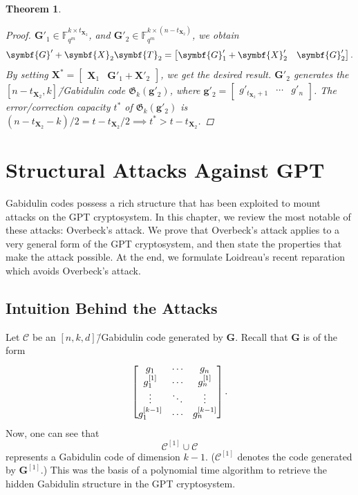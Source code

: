 \documentclass[version=last, paper=A4, parskip=half, oneside,%
toc=bibliography, toc=listof, listof=leveldown]{scrbook}
\theoremstyle{plain}
\newtheorem{theorem}{Theorem}
\theoremstyle{definition}
\theoremstyle{remark}
\renewcommand*{\vec}{\symbf}
\newcommand*{\mat}{\symbf}
\newcommand*{\FF}{\ensuremath{\mathbb{F}}}
\newcommand*{\Gab}{\ensuremath{\mathfrak{G}}}
\begin{document}
\begin{theorem}
\begin{proof}
    \(\mat{G}'_1 \in \FF_{q^m}^{k \times t_{\mat{X}_2}}\), and
    \(\mat{G}'_2 \in \FF_{q^m}^{k \times (n - t_{\mat{X}_2})}\), we obtain
    \[
      \mat{G}' + \mat{X}_2 \mat{T}_2 = \begin{bmatrix} \mat{G}'_1 + \mat{X}'_2 & \mat{G}'_2 \end{bmatrix}\text.
    \]
    By setting
    \(\mat{X}^* = \begin{bmatrix} \mat{X}_1 & \mat{G}'_1 + \mat{X}'_2 \end{bmatrix}\),
    we get the desired result.  \(\mat{G}'_2\) generates the
    \([n - t_{\mat{X}_2}, k]\)\=/Gabidulin code \(\Gab_k(\vec{g}'_2)\), where
    \(\vec{g}'_2 = \begin{bmatrix} g'_{t_{\mat{X}_2} + 1} & \cdots & g'_n \end{bmatrix}\).
    The error\-/correction capacity \(t^*\) of \(\Gab_k(\vec{g}'_2)\) is
    \((n - t_{\mat{X}_2} - k) / {2} = t - t_{\mat{X}_2} / {2} \implies t^* > t - t_{\mat{X}_2}\).
  \end{proof}
\end{theorem}

\chapter{Structural Attacks Against GPT}\label{chap:structural-attacks}

Gabidulin codes possess a rich structure that has been exploited to mount
attacks on the GPT cryptosystem.  In this chapter, we review the most notable of
these attacks: Overbeck's attack.  We prove that Overbeck's attack applies to a
very general form of the GPT cryptosystem, and then state the properties that
make the attack possible.  At the end, we formulate Loidreau's recent reparation
which avoids Overbeck's attack.

\section{Intuition Behind the Attacks}

Let \(\mathcal{C}\) be an \([n, k, d]\)\=/Gabidulin code generated by
\(\mat{G}\).  Recall that \(\mat{G}\) is of the form
\[
  \begin{bmatrix}
    g_1 & \cdots & g_n \\
    g_1^{[1]} & \cdots & g_n^{[1]} \\
    \vdots & \ddots & \vdots \\
    g_1^{[k - 1]} & \cdots & g_n^{[k - 1]}
  \end{bmatrix}\text.
\]
Now, one can see that
\[
  \mathcal{C}^{[1]} \cup \mathcal{C}
\]
represents a Gabidulin code of dimension \(k - 1\).  (\(\mathcal{C}^{[1]}\)
denotes the code generated by \(\mat{G}^{[1]}\).)  This was the basis of a
polynomial time algorithm to retrieve the hidden Gabidulin structure in the GPT
cryptosystem.
\end{document}
